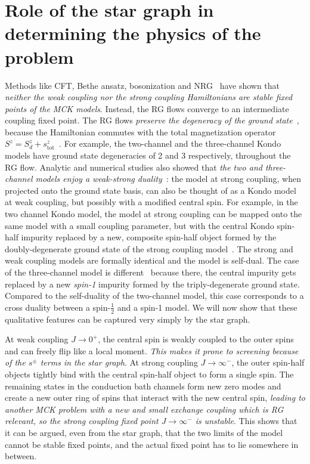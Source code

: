 \documentclass[12pt]{revtex4-2}
\begin{document}
\section{Role of the star graph in determining the physics of the problem}
Methods like CFT, Bethe ansatz, bosonization and NRG~\cite{affleck_1991_overscreen,Tsvelick_Weigmann_mchannel_1984,Gan_mchannel_1994,pang_cox_1991,emery_kivelson,vondelft_prl_1998} have shown that \textit{neither the weak coupling nor the strong coupling Hamiltonians are stable fixed points of the MCK models}. Instead, the RG flows converge to an intermediate coupling fixed point. The RG flows \textit{preserve the degeneracy of the ground state}~\cite{pang_cox_1991,kroha_kolf_2007,zitko_fabrizio_2017}, because the Hamiltonian commutes with the total magnetization operator \(S^z = S_d^z + s_\text{tot}^z\)~\cite{vondelft_prl_1998}. For example, the two-channel and the three-channel Kondo models have ground state degeneracies of 2 and 3 respectively, throughout the RG flow. Analytic and numerical studies also showed that \textit{the two and three-channel models enjoy a weak-strong duality}~\cite{kroha_kolf_2007,zitko_fabrizio_2017}: the model at strong coupling, when projected onto the ground state basis, can also be thought of as a Kondo model at weak coupling, but possibly with a modified central spin. For example, in the two channel Kondo model, the model at strong coupling can be mapped onto the same model with a small coupling parameter, but with the central Kondo spin-half impurity replaced by a new, composite spin-half object formed by the doubly-degenerate ground state of the strong coupling model~\cite{kroha_kolf_2007}. The strong and weak coupling models are formally identical and the model is self-dual. The case of the three-channel model is different~\cite{zitko_fabrizio_2017} because there, the central impurity gets replaced by a new \textit{spin-1} impurity formed by the triply-degenerate ground state. Compared to the self-duality of the two-channel model, this case corresponds to a cross duality between a spin-\(\frac{1}{2}\) and a spin-1 model. We will now show that these qualitative features can be captured very simply by the star graph.

At weak coupling \(J \to 0^+\), the central spin is weakly coupled to the outer spins and can freely flip like a local moment. \textit{This makes it prone to screening because of the \(s^\pm\) terms in the star graph}. At strong coupling \(J \to \infty^-\), the outer spin-half objects tightly bind with the central spin-half object to form a single spin. The remaining states in the conduction bath channels form new zero modes and create a new outer ring of spins that interact with the new central spin, \textit{leading to another MCK problem with a new and small exchange coupling which is RG relevant, so the strong coupling fixed point \(J \to \infty^-\) is unstable}. This shows that it can be argued, even from the star graph, that the two limits of the model cannot be stable fixed points, and the actual fixed point has to lie somewhere in between.
\end{document}
